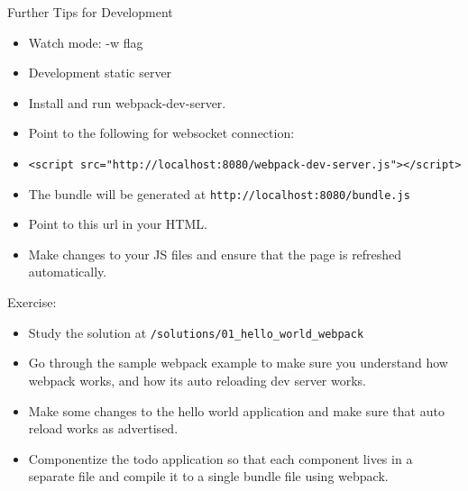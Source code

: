 \documentclass[presentation]{beamer}
\begin{document}
\begin{frame}[fragile,label={sec:orgheadline12}]{Further Tips for Development}
 \begin{itemize}
\item Watch mode: -w flag
\item Development static server

\item Install and run webpack-dev-server.

\item Point to the following for websocket connection:

\item \texttt{<script src="http://localhost:8080/webpack-dev-server.js"></script>}

\item The bundle will be generated at \texttt{http://localhost:8080/bundle.js}

\item Point to this url in your HTML.

\item Make changes to your JS files and ensure that the page is refreshed
automatically.
\end{itemize}
\end{frame}

\begin{frame}[fragile,label={sec:orgheadline13}]{Exercise:}
 \begin{itemize}
\item Study the solution at \texttt{/solutions/01\_hello\_world\_webpack}
\item Go through the sample webpack example to make sure you understand how
webpack works, and how its auto reloading dev server works.
\item Make some changes to the hello world application and make sure that auto
reload works as advertised.
\item Componentize the todo application so that each component lives in a separate
file and compile it to a single bundle file using webpack.
\end{itemize}
\end{frame}
\end{document}
